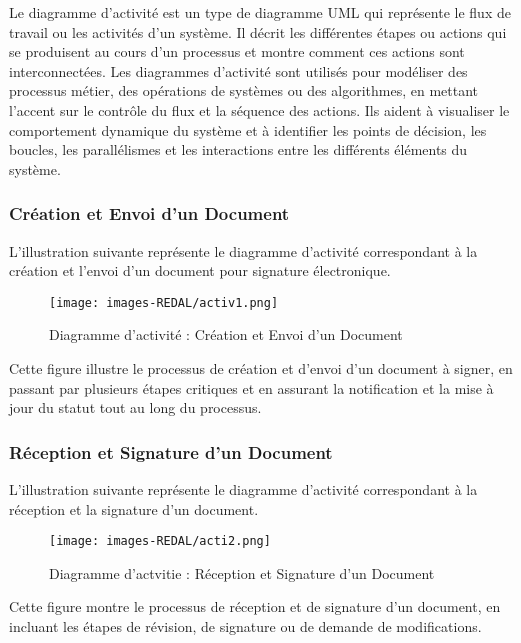 Le diagramme d’activité est un type de diagramme UML qui représente le flux de travail ou les activités d’un système. Il décrit les différentes étapes ou actions qui se produisent au cours d’un processus et montre comment ces actions sont interconnectées. Les diagrammes d’activité sont utilisés pour modéliser des processus métier, des opérations de systèmes ou des algorithmes, en mettant l’accent sur le contrôle du flux et la séquence des actions. Ils aident à visualiser le comportement dynamique du système et à identifier les points de décision, les boucles, les parallélismes et les interactions entre les différents éléments du système.

\subsubsection{ Création et Envoi d'un Document}
L’illustration suivante représente le diagramme d’activité correspondant à la création et l’envoi d'un document pour signature électronique.

\begin{figure}[H]
\begin{center}
\texttt{[image: images-REDAL/activ1.png]}
\end{center}
\caption{Diagramme d'activité :  Création et Envoi d'un Document }
\end{figure}

Cette figure illustre le processus de création et d'envoi d'un document à signer, en passant par plusieurs étapes critiques et en assurant la notification et la mise à jour du statut tout au long du processus.

\subsubsection{Réception et Signature d'un Document}
L’illustration suivante représente le diagramme d’activité correspondant à la réception et la signature d'un document.

\begin{figure}[H]
\begin{center}
\texttt{[image: images-REDAL/acti2.png]}
\end{center}
\caption{Diagramme d'actvitie :  Réception et Signature d'un Document }
\end{figure}


Cette figure montre le processus de réception et de signature d'un document, en incluant les étapes de révision, de signature ou de demande de modifications.

